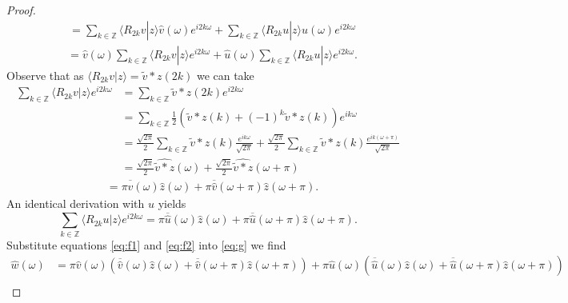 \documentclass{report}
\newcommand{\Z}{\mathbb{Z}}
\begin{document}
\begin{proof}
\begin{align*}
   &=  \sum_{k\in \Z}\langle R_{2k}v|z\rangle \hat v(\omega)e^{i2k\omega}+\sum_{k\in \Z}\langle R_{2k}u|z\rangle \hat u(\omega) e^{i2k\omega}
\end{align*}
\begin{align}
\label{eq:g}
&=  \hat v(\omega) \sum_{k\in \Z}\langle R_{2k}v|z\rangle e^{i2k\omega}+\hat u(\omega) \sum_{k\in \Z}\langle R_{2k}u|z\rangle  e^{i2k\omega}.
\end{align}
Observe that as $\langle R_{2k}v|z\rangle=\tilde{v}\ast z (2k)$ we can take
\begin{align*}
\sum_{k \in \Z} \langle R_{2k}v|z\rangle e^{i2k\omega} &=\sum_{k \in \Z} \tilde{v}\ast z (2k) e^{i2k\omega} \\
&=\sum_{k \in \Z}  \frac 1 2 \left ( \tilde{v}\ast z (k) +(-1)^k \tilde{v}\ast z (k) \right ) e^{ik\omega} \\
&= \frac {\sqrt{2\pi}} 2 \sum_{k \in \Z} \tilde{v}\ast z (k)\frac{e^{ik\omega}}{\sqrt{2\pi}} + \frac {\sqrt{2\pi}} 2 \sum_{k \in \Z} \tilde{v}\ast z (k)  \frac{e^{ik(\omega+\pi)}}{\sqrt{2\pi}} \\
&= \frac {\sqrt{2\pi}} 2  \widehat{ \tilde{v}\ast z }(\omega) + \frac {\sqrt{2\pi}} 2  \widehat{ \tilde{v}\ast z }(\omega+\pi)
\end{align*}
\begin{align}
\label{eq:f1}
&= \pi  \overline{\hat v}(\omega)\hat z(\omega) +\pi  \overline{\hat v}(\omega+\pi)\hat z(\omega+\pi).
 \end{align}
 An identical derivation with $u$ yields
 \begin{equation}
 \label{eq:f2}
\sum_{k \in \Z} \langle R_{2k}u|z\rangle e^{i2k\omega}=\pi \overline{\hat u}(\omega)\hat z(\omega) +\pi  \overline{\hat u}(\omega+\pi)\hat z(\omega+\pi).
\end{equation}
Substitute equations \eqref{eq:f1} and \eqref{eq:f2} into \eqref{eq:g} we find
\begin{align*}
\hat w (\omega)&= \pi \hat v(\omega)( \overline{\hat v}(\omega)\hat z(\omega) +  \overline{\hat v}(\omega+\pi)\hat z(\omega+\pi))+\pi \hat u(\omega)(  \overline{\hat u}(\omega)\hat z(\omega) +  \overline{\hat u}(\omega+\pi)\hat z(\omega+\pi))\\

\end{align*}
\end{proof}
\end{document}
